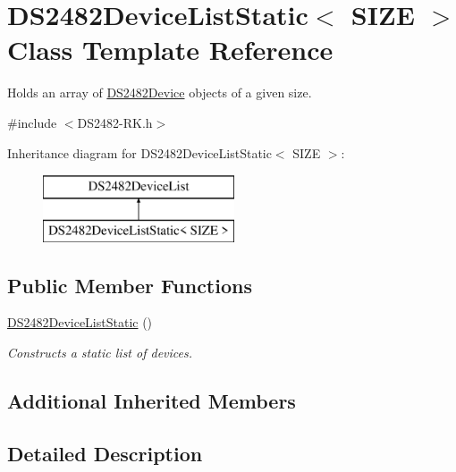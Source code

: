 \hypertarget{class_d_s2482_device_list_static}{}\section{D\+S2482\+Device\+List\+Static$<$ S\+I\+ZE $>$ Class Template Reference}
\label{class_d_s2482_device_list_static}


Holds an array of \mbox{\hyperlink{class_d_s2482_device}{D\+S2482\+Device}} objects of a given size.  




{\ttfamily \#include $<$D\+S2482-\/\+R\+K.\+h$>$}

Inheritance diagram for D\+S2482\+Device\+List\+Static$<$ S\+I\+ZE $>$\+:\begin{figure}[H]
\begin{center}
\leavevmode
\includegraphics[height=2.000000cm]{class_d_s2482_device_list_static}
\end{center}
\end{figure}
\subsection*{Public Member Functions}
\begin{DoxyCompactItemize}
\item 
\mbox{\label{class_d_s2482_device_list_static_ae3709f01bf5902dbeaf00a55772cdc32}} 
\mbox{\hyperlink{class_d_s2482_device_list_static_ae3709f01bf5902dbeaf00a55772cdc32}{D\+S2482\+Device\+List\+Static}} ()
\begin{DoxyCompactList}\small\item\em Constructs a static list of devices. \end{DoxyCompactList}\end{DoxyCompactItemize}
\subsection*{Additional Inherited Members}


\subsection{Detailed Description}
